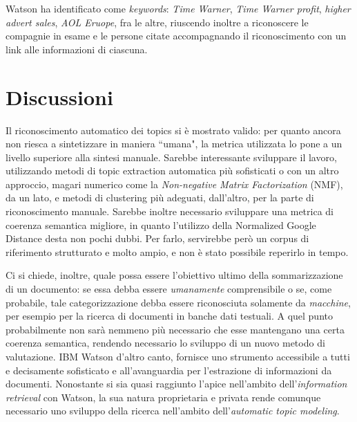 \documentclass[]{article}
\begin{document}
Watson ha identificato come \textit{keywords}: \textit{Time Warner}, \textit{Time Warner profit}, \textit{higher advert sales}, \textit{AOL Eruope}, fra le altre, riuscendo inoltre a riconoscere le compagnie in esame e le persone citate accompagnando il riconoscimento con un link alle informazioni di ciascuna.
\section{Discussioni}
Il riconoscimento automatico dei topics si è mostrato valido: per quanto ancora non riesca a sintetizzare in maniera ``umana", la metrica utilizzata lo pone a un livello superiore alla sintesi manuale. Sarebbe interessante sviluppare il lavoro, utilizzando metodi di topic extraction automatica più sofisticati o con un altro approccio, magari numerico come la \textit{Non-negative Matrix Factorization }(NMF), da un lato, e metodi di clustering più adeguati, dall'altro, per la parte di riconoscimento manuale.
\newline
Sarebbe inoltre necessario sviluppare una metrica di coerenza semantica migliore, in quanto l'utilizzo della Normalized Google Distance desta non pochi dubbi. Per farlo, servirebbe però un corpus di riferimento strutturato e molto ampio, e non è stato possibile reperirlo in tempo.


Ci si chiede, inoltre, quale possa essere l'obiettivo ultimo della sommarizzazione di un documento: se essa debba essere \textit{umanamente} comprensibile o se, come probabile, tale categorizzazione debba essere riconosciuta solamente da \textit{macchine}, per esempio per la ricerca di documenti in banche dati testuali. A quel punto probabilmente non sarà nemmeno più necessario che esse mantengano una certa coerenza semantica, rendendo necessario lo sviluppo di un nuovo metodo di valutazione.
\newline
IBM Watson d'altro canto, fornisce uno strumento accessibile a tutti e decisamente sofisticato e all'avanguardia per l'estrazione di informazioni da documenti. Nonostante si sia quasi raggiunto l'apice nell'ambito dell'\textit{information retrieval} con Watson, la sua natura proprietaria e privata rende comunque necessario uno sviluppo della ricerca nell'ambito dell'\textit{automatic topic modeling}.

\nocite{*}
\printbibliography
\end{document}
